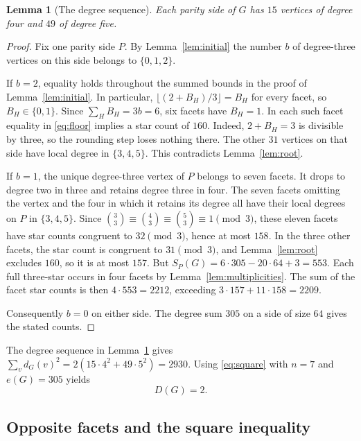 \documentclass[11pt,reqno]{amsart}
\numberwithin{equation}{section}
\newtheorem{lemma}[theorem]{Lemma}
\begin{document}
\begin{lemma}[The degree sequence]\label{lem:degrees}
Each parity side of \(G\) has \(15\) vertices of degree four and
\(49\) of degree five.
\end{lemma}

\begin{proof}
Fix one parity side \(P\). By Lemma~\ref{lem:initial} the number \(b\)
of degree-three vertices on this side belongs to \(\{0,1,2\}\).

If \(b=2\), equality holds throughout the summed bounds in the proof
of Lemma~\ref{lem:initial}. In particular,
\(\lfloor(2+B_H)/3\rfloor=B_H\) for every facet, so \(B_H\in\{0,1\}\).
Since \(\sum_H B_H=3b=6\), six facets have \(B_H=1\). In each such
facet equality in \eqref{eq:floor} implies a star count of \(160\).
Indeed, \(2+B_H=3\) is divisible by three, so the rounding step
loses nothing there. The other \(31\) vertices on that side have
local degree in \(\{3,4,5\}\). This contradicts
Lemma~\ref{lem:root}.

If \(b=1\), the unique degree-three vertex of \(P\) belongs to seven
facets. It drops to degree two in three and retains degree three in
four. The seven facets omitting the vertex and the four in which it
retains its degree all have their local degrees on \(P\) in
\(\{3,4,5\}\). Since
\(\binom33\equiv\binom43\equiv\binom53\equiv1\pmod3\),
these eleven facets have star counts congruent to \(32\pmod3\),
hence at most \(158\).
In the three other facets, the star count is congruent to \(31\pmod3\),
and Lemma~\ref{lem:root} excludes \(160\), so it is at most \(157\).
But \(S_P(G)=6\cdot305-20\cdot64+3=553\).
Each full three-star occurs in four facets by
Lemma~\ref{lem:multiplicities}. The sum of the facet star counts is
then \(4\cdot553=2212\), exceeding \(3\cdot157+11\cdot158=2209\).

Consequently \(b=0\) on either side. The degree sum \(305\) on a
side of size \(64\) gives the stated counts.
\end{proof}

The degree sequence in Lemma~\ref{lem:degrees} gives
\(\sum_v d_G(v)^2=2(15\cdot4^2+49\cdot5^2)=2930\).
Using \eqref{eq:square} with \(n=7\) and \(e(G)=305\) yields
\begin{equation}\label{eq:globalD}
  D(G)=2.
\end{equation}

\subsection{Opposite facets and the square inequality}
\end{document}
